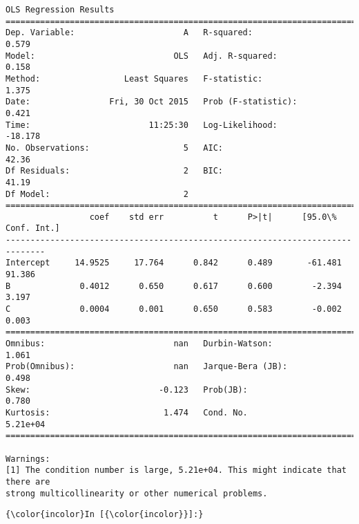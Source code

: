 \documentclass{article}
\begin{document}
    \begin{Verbatim}[commandchars=\\\{\}]
OLS Regression Results                            
==============================================================================
Dep. Variable:                      A   R-squared:                       0.579
Model:                            OLS   Adj. R-squared:                  0.158
Method:                 Least Squares   F-statistic:                     1.375
Date:                Fri, 30 Oct 2015   Prob (F-statistic):              0.421
Time:                        11:25:30   Log-Likelihood:                -18.178
No. Observations:                   5   AIC:                             42.36
Df Residuals:                       2   BIC:                             41.19
Df Model:                           2                                         
==============================================================================
                 coef    std err          t      P>|t|      [95.0\% Conf. Int.]
------------------------------------------------------------------------------
Intercept     14.9525     17.764      0.842      0.489       -61.481    91.386
B              0.4012      0.650      0.617      0.600        -2.394     3.197
C              0.0004      0.001      0.650      0.583        -0.002     0.003
==============================================================================
Omnibus:                          nan   Durbin-Watson:                   1.061
Prob(Omnibus):                    nan   Jarque-Bera (JB):                0.498
Skew:                          -0.123   Prob(JB):                        0.780
Kurtosis:                       1.474   Cond. No.                     5.21e+04
==============================================================================

Warnings:
[1] The condition number is large, 5.21e+04. This might indicate that there are
strong multicollinearity or other numerical problems.
    \end{Verbatim}

    \begin{Verbatim}[commandchars=\\\{\}]
{\color{incolor}In [{\color{incolor}}]:} 
\end{Verbatim}


    
    
    
    
\end{document}
